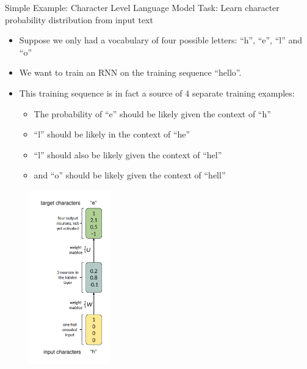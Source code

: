 \begin{vbframe}{Simple Example: Character Level Language Model}
       Task: Learn character probability distribution from input text
   \begin{itemize}
     \item Suppose we only had a vocabulary of four possible letters: \enquote{h}, \enquote{e}, \enquote{l} and \enquote{o}
     \item We want to train an RNN on the training sequence \enquote{hello}.
     \item This training sequence is in fact a source of 4 separate training examples:
       \begin{itemize}
         \item The probability of \enquote{e} should be likely given the context of \enquote{h}
         \item \enquote{l} should be likely in the context of \enquote{he}
         \item \enquote{l} should also be likely given the context of \enquote{hel}
         \item and \enquote{o} should be likely given the context of \enquote{hell}
       \end{itemize}
   \end{itemize}
   
   \begin{minipage}{0.55\textwidth}
      \begin{figure}
         \includegraphics[width=3.5cm]{plots/nlp1a.png}%
     \end{figure}
  \end{minipage}%


\end{vbframe}
